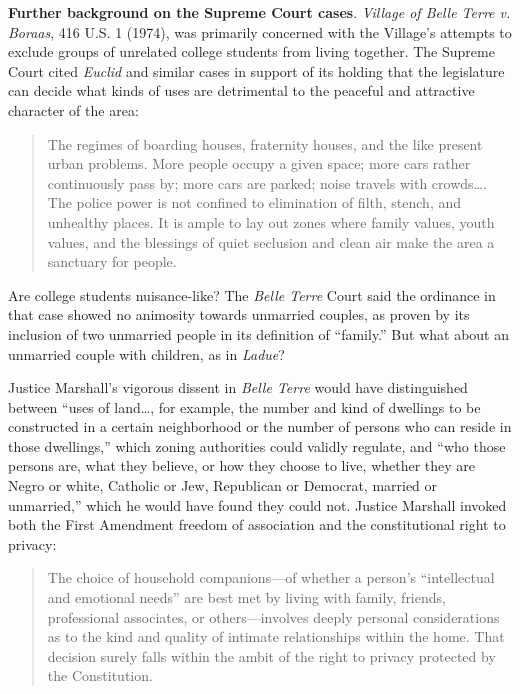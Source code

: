 
\item
\textbf{Further background on the Supreme Court cases}. \textit{Village of Belle
Terre v. Boraas}, 416 U.S. 1 (1974), was primarily concerned with the Village's
attempts to exclude groups of unrelated college students from living together.
The Supreme Court cited \textit{Euclid} and similar cases in support of its
holding that the legislature can decide what kinds of uses are detrimental to
the peaceful and attractive character of the area:
\begin{quote}
The regimes of boarding houses, fraternity houses, and the like present urban
problems. More people occupy a given space; more cars rather continuously pass
by; more cars are parked; noise travels with crowds\ldots . The police power is
not confined to elimination of filth, stench, and unhealthy places. It is ample
to lay out zones where family values, youth values, and the blessings of quiet
seclusion and clean air make the area a sanctuary for people.
\end{quote}



Are college students nuisance-like? The \textit{Belle Terre} Court said the
ordinance in that case showed no animosity towards unmarried couples, as proven
by its inclusion of two unmarried people in its definition of ``family.'' But
what about an unmarried couple with children, as in \textit{Ladue}?

\item
Justice Marshall's vigorous dissent in \textit{Belle Terre} would have
distinguished between ``uses of land\ldots , for example, the number and kind of
dwellings to be constructed in a certain neighborhood or the number of persons
who can reside in those dwellings,'' which zoning authorities could validly
regulate, and ``who those persons are, what they believe, or how they choose to
live, whether they are Negro or white, Catholic or Jew, Republican or Democrat,
married or unmarried,'' which he would have found they could not. Justice
Marshall invoked both the First Amendment freedom of association and the
constitutional right to privacy:
\begin{quote}
The choice of household companions---of whether a person's ``intellectual and
emotional needs'' are best met by living with family, friends, professional
associates, or others---involves deeply personal considerations as to the kind
and quality of intimate relationships within the home. That decision surely
falls within the ambit of the right to privacy protected by the Constitution. 
\end{quote}

